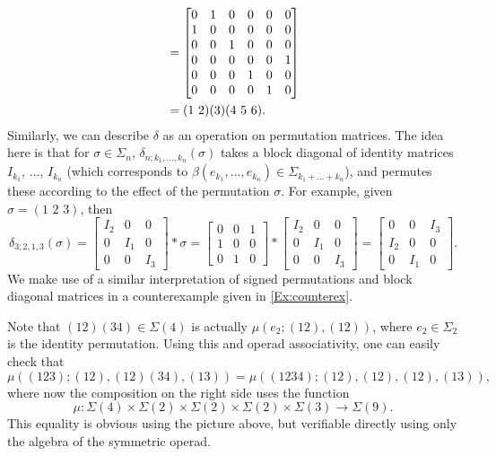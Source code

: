 \begin{example}
\begin{remark}
\begin{align*}
  &=
  \begin{bmatrix}
  0 & 1 & 0 & 0 & 0 & 0 \\
  1 & 0 & 0 & 0 & 0 & 0 \\
  0 & 0 & 1 & 0 & 0 & 0 \\
  0 & 0 & 0 & 0 & 0 & 1 \\
  0 & 0 & 0 & 1 & 0 & 0 \\
  0 & 0 & 0 & 0 & 1 & 0 \\
  \end{bmatrix} \\
  &= ( 1 \, \, 2 )(3)(4 \,\, 5 \,\, 6).
  \end{align*}
Similarly, we can describe $\delta$ as an operation on permutation matrices. The idea here is that for $\sigma \in \Sigma_n$, $\delta_{n;k_1,\ldots,k_n}(\sigma)$ takes a block diagonal of identity matrices $I_{k_1}$, $\ldots$, $I_{k_n}$ (which corresponds to $\beta(e_{k_1},\ldots,e_{k_n}) \in \Sigma_{k_1+\ldots+k_n}$), and permutes these according to the effect of the permutation $\sigma$. For example, given $\sigma = (1 \,\, 2 \,\, 3)$, then
  \[
    \delta_{3;2,1,3}(\sigma) =
    \begin{bmatrix}
    I_2 & 0 & 0 \\
    0 & I_1 & 0 \\
    0 & 0 & I_3
    \end{bmatrix}
    \ast
    \sigma
    =
      \begin{bmatrix}
      0 & 0 & 1 \\
      1 & 0 & 0 \\
      0 & 1 & 0
      \end{bmatrix}
    \ast
    \begin{bmatrix}
    I_2 & 0 & 0 \\
    0 & I_1 & 0 \\
    0 & 0 & I_3
    \end{bmatrix}
    =
    \begin{bmatrix}
    0 & 0 & I_3 \\
    I_2 & 0 & 0 \\
    0 & I_1 & 0
    \end{bmatrix}.
  \]
We make use of a similar interpretation of signed permutations and block diagonal matrices in a counterexample given in \cref{Ex:counterex}.
\end{remark}

  
Note that $(12)(34) \in \Sigma(4)$ is actually $\mu(e_{2}; (12), (12))$, where $e_{2} \in \Sigma_{2}$ is the identity permutation. Using this and operad associativity, one can easily check that
  \[
    \mu \left( (123); (12), (12)(34), (13) \right) = \mu \left( (1234); (12), (12), (12), (13) \right),
  \]
where now the composition on the right side uses the function
  \[
    \mu \colon \Sigma(4) \times \Sigma(2) \times \Sigma(2) \times \Sigma(2) \times \Sigma(3) \rightarrow \Sigma(9).
  \]
This equality is obvious using the picture above, but verifiable directly using only the algebra of the symmetric operad.
\end{example}


